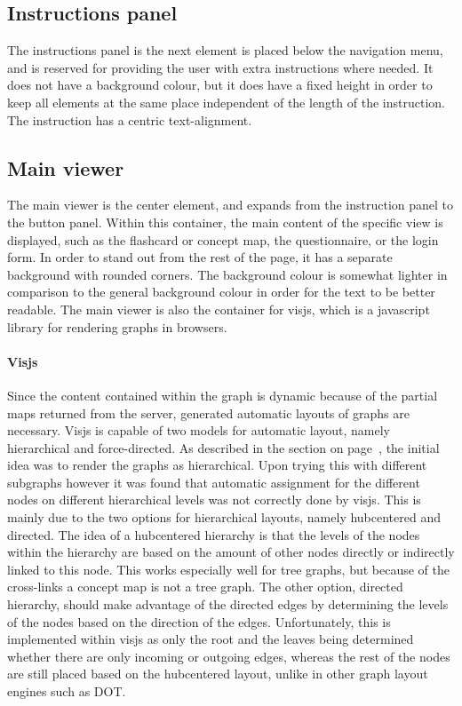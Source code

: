 \subsection{Instructions panel}

The instructions panel is the next element is placed below the navigation menu, and is reserved for providing the user with extra instructions where needed. It does not have a background colour, but it does have a fixed height in order to keep all elements at the same place independent of the length of the instruction. The instruction has a centric text-alignment.

\subsection{Main viewer}

The main viewer is the center element, and expands from the instruction panel to the button panel. Within this container, the main content of the specific view is displayed, such as the flashcard or concept map, the questionnaire, or the login form. In order to stand out from the rest of the page, it has a separate background with rounded corners. The background colour is somewhat lighter in comparison to the general background colour in order for the text to be better readable. The main viewer is also the container for visjs, which is a javascript library for rendering graphs in browsers.

\paragraph{Visjs} Since the content contained within the graph is dynamic because of the partial maps returned from the server, generated automatic layouts of graphs are necessary. Visjs is capable of two models for automatic layout, namely hierarchical and force-directed. As described in the  section on page~\pageref{sec:cmapframework}, the initial idea was to render the graphs as hierarchical. Upon trying this with different subgraphs however it was found that automatic assignment for the different nodes on different hierarchical levels was not correctly done by visjs. This is mainly due to the two options for hierarchical layouts, namely hubcentered and directed. The idea of a hubcentered hierarchy is that the levels of the nodes within the hierarchy are based on the amount of other nodes directly or indirectly linked to this node. This works especially well for tree graphs, but because of the cross-links a concept map is not a tree graph. The other option, directed hierarchy, should make advantage of the directed edges by determining the levels of the nodes based on the direction of the edges. Unfortunately, this is implemented within visjs as only the root and the leaves being determined whether there are only incoming or outgoing edges, whereas the rest of the nodes are still placed based on the hubcentered layout, unlike in other graph layout engines such as DOT. 

